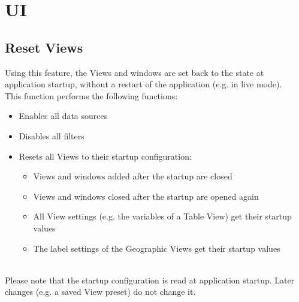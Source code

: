\section{UI}
 
\subsection{Reset Views}
\label{sec:ui_reset_views}

Using this feature, the Views and windows are set back to the state at application startup, without a restart of the application (e.g. in live mode). \\

This function performs the following functions:
\begin{itemize}
 \item Enables all data sources
 \item Disables all filters
 \item Resets all Views to their startup configuration:
 \begin{itemize}
  \item Views and windows added after the startup are closed
  \item Views and windows closed after the startup are opened again
  \item All View settings (e.g. the variables of a Table View) get their startup values
  \item The label settings of the Geographic Views get their startup values
 \end{itemize}
\end{itemize}
\  \\

Please note that the startup configuration is read at application startup. Later changes (e.g. a saved View preset) do not change it.
